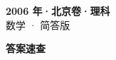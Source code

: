 \documentclass[zihao=-4, a4paper]{ctexart}
\begin{document}
\begin{center}
  {\Large\bfseries 2006 年·北京卷·理科}\\[4pt]
  {\large 数学 · 简答版}
\end{center}
\medskip
{}

\clearpage
{}
\begin{center}{\Large\bfseries 答案速查}\end{center}
\medskip

\end{document}

